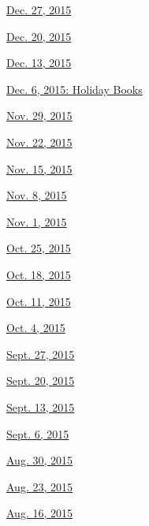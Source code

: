 \href{http://www.nytimes.com/indexes/2015/12/27/todayspaper/index.html\#bookreview}{Dec.
27, 2015}

\href{http://www.nytimes.com/indexes/2015/12/20/todayspaper/index.html\#bookreview}{Dec.
20, 2015}

\href{http://www.nytimes.com/indexes/2015/12/13/todayspaper/index.html\#bookreview}{Dec.
13, 2015}

\href{http://www.nytimes.com/indexes/2015/12/06/books/review/index.html}{Dec.
6, 2015: Holiday Books}

\href{http://www.nytimes.com/indexes/2015/11/29/books/review/index.html}{Nov.
29, 2015}

\href{http://www.nytimes.com/indexes/2015/11/22/books/review/index.html}{Nov.
22, 2015}

\href{http://www.nytimes.com/indexes/2015/11/15/books/review/index.html}{Nov.
15, 2015}

\href{http://www.nytimes.com/indexes/2015/11/08/books/review/index.html}{Nov.
8, 2015}

\href{http://www.nytimes.com/indexes/2015/11/01/books/review/index.html}{Nov.
1, 2015}

\href{http://www.nytimes.com/indexes/2015/10/25/books/review/index.html}{Oct.
25, 2015}

\href{http://www.nytimes.com/indexes/2015/10/18/books/review/index.html}{Oct.
18, 2015}

\href{http://www.nytimes.com/indexes/2015/10/11/books/review/index.html}{Oct.
11, 2015}

\href{http://www.nytimes.com/indexes/2015/10/04/books/review/index.html}{Oct.
4, 2015}

\href{http://www.nytimes.com/indexes/2015/09/27/books/review/index.html}{Sept.
27, 2015}

\href{http://www.nytimes.com/indexes/2015/09/20/books/review/index.html}{Sept.
20, 2015}

\href{http://www.nytimes.com/indexes/2015/09/13/books/review/index.html}{Sept.
13, 2015}

\href{http://www.nytimes.com/indexes/2015/09/06/books/review/index.html}{Sept.
6, 2015}

\href{http://www.nytimes.com/indexes/2015/08/30/books/review/index.html}{Aug.
30, 2015}

\href{http://www.nytimes.com/indexes/2015/08/23/books/review/index.html}{Aug.
23, 2015}

\href{http://www.nytimes.com/indexes/2015/08/16/books/review/index.html}{Aug.
16, 2015}

